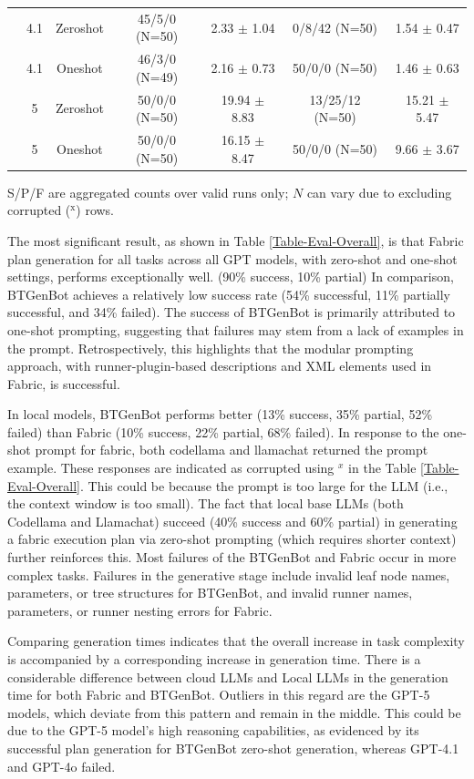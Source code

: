 \documentclass[letterpaper, 10pt, conference]{ieeeconf}      %
\begin{document}
\begin{table}[t]
\begin{tabular}{|c|c|c|cc|cc|}
        & 4.1 & Zeroshot & 45/5/0 (N=50)  & 2.33 $\pm$ 1.04 & 0/8/42 (N=50) & 1.54 $\pm$ 0.47 \\
        & 4.1 & Oneshot  & 46/3/0 (N=49)  & 2.16 $\pm$ 0.73 & 50/0/0 (N=50) & 1.46 $\pm$ 0.63 \\
        & 5   & Zeroshot & 50/0/0 (N=50)  & 19.94 $\pm$ 8.83 & 13/25/12 (N=50) & 15.21 $\pm$ 5.47 \\
        & 5   & Oneshot  & 50/0/0 (N=50)  & 16.15 $\pm$ 8.47 & 50/0/0 (N=50) & 9.66 $\pm$ 3.67 \\
    \hline
    \end{tabular}
    \vspace{1ex} 
    {\centerline{\footnotesize S/P/F are aggregated counts over valid runs only; $N$ can vary due to excluding corrupted ($^{\mathrm{x}}$) rows.}}
\end{table}

    
The most significant result, as shown in Table \ref{Table-Eval-Overall}, is that Fabric plan generation for all tasks across all GPT models, with zero-shot and one-shot settings, performs exceptionally well. (90\% success, 10\% partial) In comparison, BTGenBot achieves a relatively low success rate (54\% successful, 11\% partially successful, and 34\% failed). The success of BTGenBot is primarily attributed to one-shot prompting, suggesting that failures may stem from a lack of examples in the prompt. Retrospectively, this highlights that the modular prompting approach, with runner-plugin-based descriptions and XML elements used in Fabric, is successful.

In local models, BTGenBot performs better (13\% success, 35\% partial, 52\% failed) than Fabric (10\% success, 22\% partial, 68\% failed). In response to the one-shot prompt for fabric, both codellama and llamachat returned the prompt example. These responses are indicated as corrupted using $^x$ in the Table \ref{Table-Eval-Overall}. This could be because the prompt is too large for the LLM (i.e., the context window is too small). The fact that local base LLMs (both Codellama and Llamachat) succeed (40\% success and 60\% partial) in generating a fabric execution plan via zero-shot prompting (which requires shorter context) further reinforces this. Most failures of the BTGenBot and Fabric occur in more complex tasks. Failures in the generative stage include invalid leaf node names, parameters, or tree structures for BTGenBot, and invalid runner names, parameters, or runner nesting errors for Fabric.

Comparing generation times indicates that the overall increase in task complexity is accompanied by a corresponding increase in generation time. There is a considerable difference between cloud LLMs and Local LLMs in the generation time for both Fabric and BTGenBot. Outliers in this regard are the GPT-5 models, which deviate from this pattern and remain in the middle. This could be due to the GPT-5 model's high reasoning capabilities, as evidenced by its successful plan generation for BTGenBot zero-shot generation, whereas GPT-4.1 and GPT-4o failed.
\end{document}
